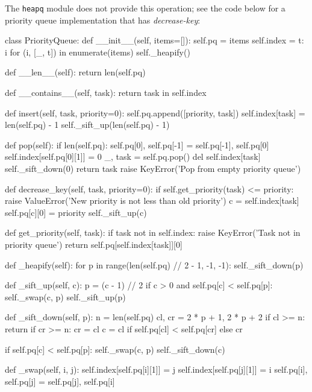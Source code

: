 \documentclass[12pt, titlepage]{article}
\begin{document}
The \texttt{heapq} module does not provide this operation; see the code below for a priority queue implementation that has \textit{decrease-key}:
\medskip
\begin{python}
class PriorityQueue:
    def __init__(self, items=[]):
        self.pq = items
        self.index = {t: i for (i, [_, t]) in enumerate(items)}
        self._heapify()

    def __len__(self):
        return len(self.pq)

    def __contains__(self, task):
        return task in self.index

    def insert(self, task, priority=0):
        self.pq.append([priority, task])
        self.index[task] = len(self.pq) - 1
        self._sift_up(len(self.pq) - 1)

    def pop(self):
        if len(self.pq):
            self.pq[0], self.pq[-1] = self.pq[-1], self.pq[0]
            self.index[self.pq[0][1]] = 0
            _, task = self.pq.pop()
            del self.index[task]
            self._sift_down(0)
            return task
        raise KeyError('Pop from empty priority queue')

    def decrease_key(self, task, priority=0):
        if self.get_priority(task) <= priority:
            raise ValueError('New priority is not less than old priority')
        c = self.index[task]
        self.pq[c][0] = priority
        self._sift_up(c)

    def get_priority(self, task):
        if task not in self.index:
            raise KeyError('Task not in priority queue')
        return self.pq[self.index[task]][0]

    def _heapify(self):
        for p in range(len(self.pq) // 2 - 1, -1, -1):
            self._sift_down(p)

    def _sift_up(self, c):
        p = (c - 1) // 2
        if c > 0 and self.pq[c] < self.pq[p]:
            self._swap(c, p)
            self._sift_up(p)

    def _sift_down(self, p):
        n = len(self.pq)
        cl, cr = 2 * p + 1, 2 * p + 2
        if cl >= n:
            return
        if cr >= n:
            cr = cl
        c = cl if self.pq[cl] < self.pq[cr] else cr

        if self.pq[c] < self.pq[p]:
            self._swap(c, p)
            self._sift_down(c)

    def _swap(self, i, j):
        self.index[self.pq[i][1]] = j
        self.index[self.pq[j][1]] = i
        self.pq[i], self.pq[j] = self.pq[j], self.pq[i]
\end{python}
\end{document}
